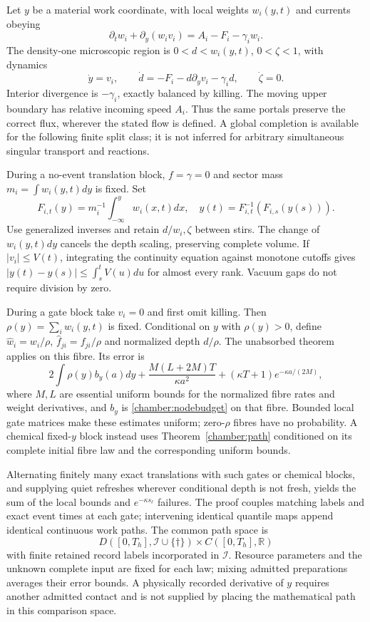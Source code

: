 \documentclass[11pt,oneside,openany]{book}
\theoremstyle{definition}
\theoremstyle{remark}\newtheorem{remark}[theorem]{Remark}
\begin{document}
Let $y$ be a material work coordinate, with local weights $w_i(y,t)$ and currents obeying
\[
 \partial_tw_i+\partial_y(w_iv_i)=A_i-F_i-\gamma_iw_i.
\]
The density-one microscopic region is $0<d<w_i(y,t)$, $0<\zeta<1$, with dynamics
\begin{equation}
 \dot y=v_i,\qquad
 \dot d=-F_i-d\partial_yv_i-\gamma_i d,
 \qquad\dot\zeta=0.
 \label{chamber:continuum}
\end{equation}
Interior divergence is $-\gamma_i$, exactly balanced by killing. The moving upper boundary has relative incoming speed $A_i$. Thus the same portals preserve the correct flux, wherever the stated flow is defined. A global completion is available for the following finite split class; it is not inferred for arbitrary simultaneous singular transport and reactions.

During a no-event translation block, $f=\gamma=0$ and sector mass $m_i=\int w_i(y,t)dy$ is fixed. Set
\[
 F_{i,t}(y)=m_i^{-1}\int_{-\infty}^yw_i(x,t)dx,
 \quad y(t)=F_{i,t}^{-1}(F_{i,s}(y(s))).
\]
Use generalized inverses and retain $d/w_i,\zeta$ between stirs. The change of $w_i(y,t)dy$ cancels the depth scaling, preserving complete volume. If $|v_i|\le V(t)$, integrating the continuity equation against monotone cutoffs gives $|y(t)-y(s)|\le\int_s^tV(u)du$ for almost every rank. Vacuum gaps do not require division by zero.

During a gate block take $v_i=0$ and first omit killing. Then $\rho(y)=\sum_iw_i(y,t)$ is fixed. Conditional on $y$ with $\rho(y)>0$, define $\widehat w_i=w_i/\rho$, $\widehat f_{ji}=f_{ji}/\rho$ and normalized depth $d/\rho$. The unabsorbed theorem applies on this fibre. Its error is
\begin{equation}
 2\int\rho(y)b_y(a)dy+
 \frac{M(L+2M)T}{\kappa a^2}
 +(\kappa T+1)e^{-\kappa a/(2M)},
 \label{chamber:fibrebound}
\end{equation}
where $M,L$ are essential uniform bounds for the normalized fibre rates and weight derivatives, and $b_y$ is \eqref{chamber:nodebudget} on that fibre. Bounded local gate matrices make these estimates uniform; zero-$\rho$ fibres have no probability. A chemical fixed-$y$ block instead uses Theorem~\ref{chamber:path} conditioned on its complete initial fibre law and the corresponding uniform bounds.

Alternating finitely many exact translations with such gates or chemical blocks, and supplying quiet refreshes wherever conditional depth is not fresh, yields the sum of the local bounds and $e^{-\kappa s_\ell}$ failures. The proof couples matching labels and exact event times at each gate; intervening identical quantile maps append identical continuous work paths. The common path space is
\[
 D([0,T_h],\mathcal I\cup\{\dagger\})\times C([0,T_h],\mathbb R)
\]
with finite retained record labels incorporated in $\mathcal I$. Resource parameters and the unknown complete input are fixed for each law; mixing admitted preparations averages their error bounds. A physically recorded derivative of $y$ requires another admitted contact and is not supplied by placing the mathematical path in this comparison space.
\end{document}

